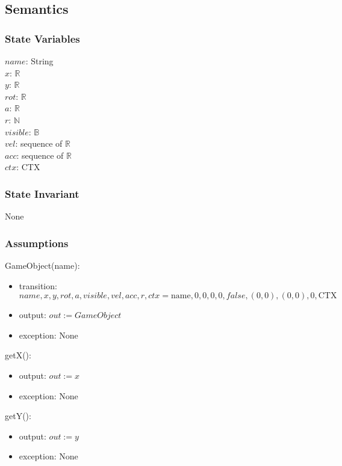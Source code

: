 \documentclass[12pt]{article}
\begin{document}
\subsection* {Semantics}

\subsubsection* {State Variables}

$name$: String\\
$x$: $\mathbb{R}$\\
$y$: $\mathbb{R}$\\
$rot$: $\mathbb{R}$\\
$a$: $\mathbb{R}$\\
$r$: $\mathbb{N}$\\
$visible$: $\mathbb{B}$\\
$vel$: sequence of $\mathbb{R}$\\
$acc$: sequence of $\mathbb{R}$\\
$ctx$: CTX\\

\subsubsection* {State Invariant}

None

\subsubsection* {Assumptions}

GameObject(name):
\begin{itemize}
    \item transition: $name, x, y, rot, a, visible, vel, acc, r, ctx = \mbox{name}, 0, 0, 0, 0, false, (0,0), (0,0), 0, \mbox{CTX}$
    \item output: $out := GameObject$
    \item exception: None
\end{itemize}

\noindent getX():
\begin{itemize}
    \item output: $out := x$
    \item exception: None
\end{itemize}

\noindent getY():
\begin{itemize}
    \item output: $out := y$
    \item exception: None
\end{itemize}
\end{document}
